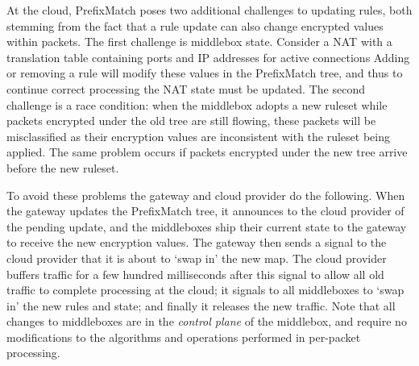
%
%
%




\label{sec:updates}
At the cloud, PrefixMatch poses two additional challenges to updating rules, both stemming from the fact that a rule update can also change encrypted values within packets.
The first challenge is middlebox state. Consider a NAT with a translation table containing ports and IP addresses for active connections
Adding or removing a rule will modify these values in the PrefixMatch tree, and thus to continue correct processing the NAT state must be updated.
The second challenge is a race condition: when the middlebox adopts a new ruleset while packets encrypted under the old tree are still flowing, these packets will be misclassified as their encryption values are inconsistent with the ruleset being applied. 
The same problem occurs if packets encrypted under the new tree arrive before the new ruleset.

To avoid these problems the gateway and cloud provider do the following. 
When the gateway updates the PrefixMatch tree, it announces to the cloud provider of the pending update, and the middleboxes ship their current state to the gateway to receive the new encryption values.
The gateway then sends a signal to the cloud provider that it is about to `swap in' the new map. 
The cloud provider buffers traffic for a few hundred milliseconds after this signal to allow all old traffic to complete processing at the cloud; it signals to all middleboxes to `swap in' the new rules and state; and finally it releases the new traffic.
Note that all changes to middleboxes are in the {\it control plane} of the middlebox, and require no modifications to the algorithms and operations performed in per-packet processing. 

